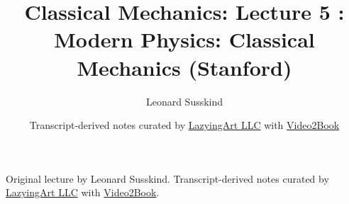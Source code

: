 \documentclass[11pt,oneside]{book}
\begin{document}
\frontmatter
\title{Classical Mechanics: Lecture 5 : Modern Physics: Classical Mechanics (Stanford)}
\author{Leonard Susskind}
\date{Transcript-derived notes curated by \href{https://lazying.art}{LazyingArt LLC} with \href{https://github.com/lachlanchen/Video2Book}{Video2Book}}
\maketitle
\begin{center}
\small Original lecture by Leonard Susskind. Transcript-derived notes curated by \href{https://lazying.art}{LazyingArt LLC} with \href{https://github.com/lachlanchen/Video2Book}{Video2Book}.
\end{center}
\clearpage
\mainmatter

\end{document}
